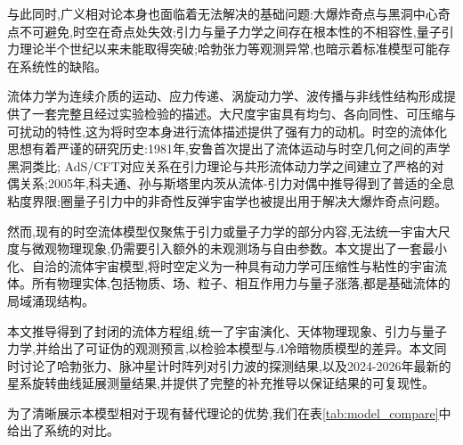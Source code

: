 \documentclass[11pt,a4paper]{article}
\begin{document}
与此同时,广义相对论本身也面临着无法解决的基础问题:大爆炸奇点与黑洞中心奇点不可避免,时空在奇点处失效;引力与量子力学之间存在根本性的不相容性,量子引力理论半个世纪以来未能取得突破;哈勃张力等观测异常,也暗示着标准模型可能存在系统性的缺陷。

流体力学为连续介质的运动、应力传递、涡旋动力学、波传播与非线性结构形成提供了一套完整且经过实验检验的描述。大尺度宇宙具有均匀、各向同性、可压缩与可扰动的特性,这为将时空本身进行流体描述提供了强有力的动机。时空的流体化思想有着严谨的研究历史:1981年,安鲁首次提出了流体运动与时空几何之间的声学黑洞类比\cite{unruh1981experimental}; AdS/CFT对应关系在引力理论与共形流体动力学之间建立了严格的对偶关系\cite{maldacena1999large};2005年,科夫通、孙与斯塔里内茨从流体-引力对偶中推导得到了普适的全息粘度界限\cite{kovtun2005viscosity};圈量子引力中的非奇性反弹宇宙学也被提出用于解决大爆炸奇点问题\cite{ashtekar2011loop}。

然而,现有的时空流体模型仅聚焦于引力或量子力学的部分内容,无法统一宇宙大尺度与微观物理现象,仍需要引入额外的未观测场与自由参数。本文提出了一套最小化、自洽的流体宇宙模型,将时空定义为一种具有动力学可压缩性与粘性的宇宙流体。所有物理实体,包括物质、场、粒子、相互作用力与量子涨落,都是基础流体的局域涌现结构。

本文推导得到了封闭的流体方程组,统一了宇宙演化、天体物理现象、引力与量子力学,并给出了可证伪的观测预言,以检验本模型与$\Lambda$冷暗物质模型的差异。本文同时讨论了哈勃张力、脉冲星计时阵列对引力波的探测结果,以及2024-2026年最新的星系旋转曲线延展测量结果,并提供了完整的补充推导以保证结果的可复现性。

为了清晰展示本模型相对于现有替代理论的优势,我们在表\ref{tab:model_compare}中给出了系统的对比。

\begin{table}[h!]
\centering
\caption{流体宇宙模型与现有替代理论的对比}
\label{tab:model_compare}
\end{table}
\end{document}
